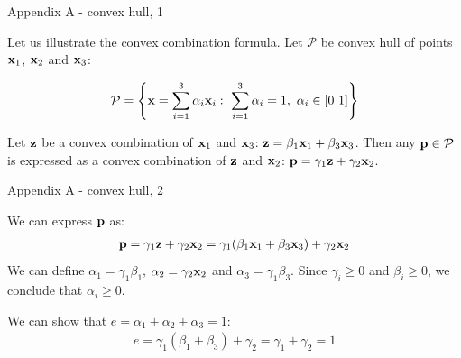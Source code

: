 \documentclass{beamer}
\begin{document}
\begin{frame}{Appendix A - convex hull, 1}
	\begin{flushleft}
		
		
		\begin{figure}[.45\textwidth]
			\centering
			\resizebox{.65\textwidth}{!}
			{}
		\end{figure}
		
		Let us illustrate the convex combination formula. 
		Let $\mathcal{P}$ be convex hull of points $\mathbf{x}_1$, $\mathbf{x}_2$ and $\mathbf{x}_3$:
		
		
		\begin{equation}
			\mathcal{P} = \left \{  \mathbf{x} = \sum_{i=1}^{3} \alpha_i\mathbf{x}_i: \   \sum_{i=1}^{3} \alpha_i = 1, \  \alpha_i  \in [0 \ 1] \right \}
		\end{equation}
		
		Let $\mathbf{z}$ be a convex combination of $\mathbf{x}_1$ and $\mathbf{x}_3$: $\mathbf{z} = \beta_1 \mathbf{x}_1 + \beta_3 \mathbf{x}_3 $. Then any $\mathbf{p} \in \mathcal{P}$ is expressed as a convex combination of $\mathbf{z}$ and $\mathbf{x}_2$: $\mathbf{p} = \gamma_1 \mathbf{z} + \gamma_2 \mathbf{x}_2$.
		
	\end{flushleft}
\end{frame}



\begin{frame}{Appendix A - convex hull, 2}
	\begin{flushleft}
		
		
		
		\begin{figure}[.45\textwidth]
			\centering
			\resizebox{.45\textwidth}{!}
			{}
		\end{figure}
		
		We can express $\mathbf{p}$ as:
		\begin{align}
			\mathbf{p} =  \gamma_1 \mathbf{z} + \gamma_2 \mathbf{x}_2 
			           = \gamma_1 (\beta_1 \mathbf{x}_1 + \beta_3 \mathbf{x}_3 )+ \gamma_2 \mathbf{x}_2
		\end{align}
		We can define $\alpha_1 = \gamma_1 \beta_1$, $\alpha_2= \gamma_2 \mathbf{x}_2$ and $\alpha_3 = \gamma_1 \beta_3$. Since $\gamma_i \geq 0$ and $\beta_i \geq 0$, we conclude that $\alpha_i \geq 0$.
		
		\bigskip
		
		We can show that $e = \alpha_1 + \alpha_2+\alpha_3 = 1$:
		\begin{align}
			e =  \gamma_1(\beta_1 +\beta_3) + \gamma_2 = \gamma_1 + \gamma_2 = 1
		\end{align}
		
		
	\end{flushleft}
\end{frame}
\end{document}
